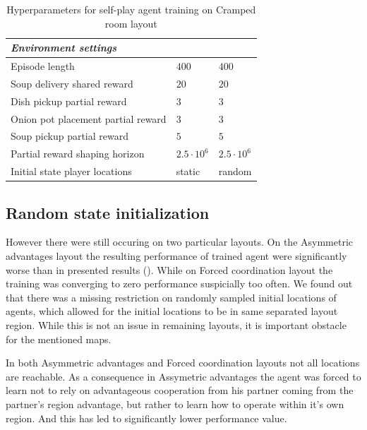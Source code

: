 \begin{table}[htbp]
\begin{tabular}{lll}
      \textit{Environment settings}                &                                   &                                   \\ \midrule                                
      Episode length                               & $400$                             & $400$                             \\
      Soup delivery shared reward                  & $20$                              & $20$                              \\
      Dish pickup partial reward                   & $3$                               & $3$                               \\
      Onion pot placement partial reward           & $3$                               & $3$                               \\
      Soup pickup partial reward                   & $5$                               & $5$                               \\
      Partial reward shaping horizon               & $2.5\cdot 10^6$                   & $2.5\cdot 10^6$                   \\
      Initial state player locations               & static                            & random                            \\
     \bottomrule
    \end{tabular}
    \caption{Hyperparameters for self-play agent training on Cramped room layout}
    \label{tab:hyperparameters-algo}
  \end{table}
  


\subsection{Random state initialization}
However there were still occuring on two particular layouts.
On the Asymmetric advantages layout the resulting performance of trained agent were significantly worse than in presented results (\cite{carroll2020utility}).
While on Forced coordination layout the training was converging to zero performance suspicially too often.
We found out that there was a missing restriction on randomly sampled initial locations of agents, which allowed for the initial locations to be in same separated layout region.
While this is not an issue in remaining layouts, it is important obstacle for the mentioned maps.

In both Asymmetric advantages and Forced coordination layouts not all locations are reachable.
As a consequence in Assymetric advantages the agent was forced to learn not to rely on advantageous cooperation from his partner coming from the partner's region advantage, but rather to learn how to operate within it's own region.
And this has led to significantly lower performance value.

